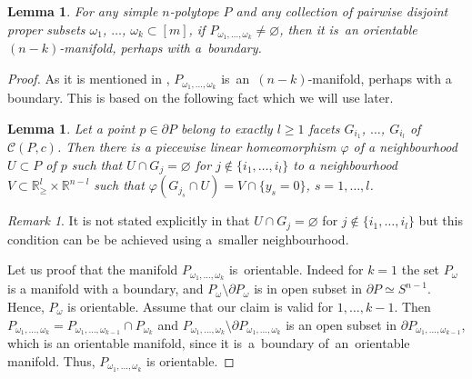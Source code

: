 \documentclass[12pt]{amsart}
\newtheorem{lemma}[formula]{Lemma}
\theoremstyle{definition}
\theoremstyle{remark}
\newtheorem{remark}[formula]{Remark}
\begin{document}
\begin{lemma}\label{lem:or}
For any simple $n$-polytope $P$ and any collection of pairwise disjoint
proper subsets $\omega_1$, $\dots$, $\omega_k \subset [m]$,  if  
$P_{\omega_1,\dots,\omega_k}\ne\varnothing$, then it is~an orientable~$(n-k)$-manifold, perhaps with a~boundary.
\end{lemma}
\begin{proof}
As it is mentioned in \cite[Corollary 2.4]{E24}, $P_{\omega_1,\dots,\omega_k}$ 
is~an~$(n-k)$-manifold, perhaps with a boundary. This is based on the following fact
which we will use later.
\begin{lemma}\label{lem:Mc}\cite[Lemma 2.2]{E24}
Let a point $p\in\partial P$ belong to exactly $l\geqslant 1$ facets $G_{i_1}$, $\dots$, $G_{i_l}$ of $\mathcal{C}(P,c)$. 
Then there is a piecewise linear homeomorphism  $\varphi$ of a neighbourhood $U\subset P$ of $p$ such that 
$U\cap G_j=\varnothing$ for $j\notin \{i_1,\dots, i_l\}$ to a neighbourhood 
$V\subset \mathbb R^l_{\geqslant}\times\mathbb R^{n-l}$ such that $\varphi(G_{j_s}\cap U)=V\cap\{y_s=0\}$, $s=1,\dots,l$.  
\end{lemma}
\begin{remark}
It is not stated explicitly in \cite[Lemma 2.2]{E24} that $U\cap G_j=\varnothing$ for $j\notin \{i_1,\dots, i_l\}$ but this
condition can be be achieved using a~smaller neighbourhood.
\end{remark}
Let us proof that the manifold $P_{\omega_1,\dots,\omega_k}$ is~orientable.
Indeed for $k=1$ the set $P_{\omega}$ is a manifold with a boundary, and $P_{\omega}\setminus\partial P_{\omega}$
is in open subset in $\partial P\simeq S^{n-1}$. Hence, $P_{\omega}$ is orientable.
Assume that our claim is valid for $1,\dots,k-1$. Then  
$P_{\omega_1,\dots,\omega_k}=P_{\omega_1,\dots,\omega_{k-1}}\cap P_{\omega_k}$ and 
$P_{\omega_1,\dots,\omega_k}\setminus\partial P_{\omega_1,\dots,\omega_k}$ is an open subset in 
$\partial P_{\omega_1,\dots,\omega_{k-1}}$, which is an orientable
manifold, since it is~a~boundary of~an~orientable manifold. Thus, $P_{\omega_1,\dots,\omega_k}$ is orientable. 
\end{proof}
\end{document}
